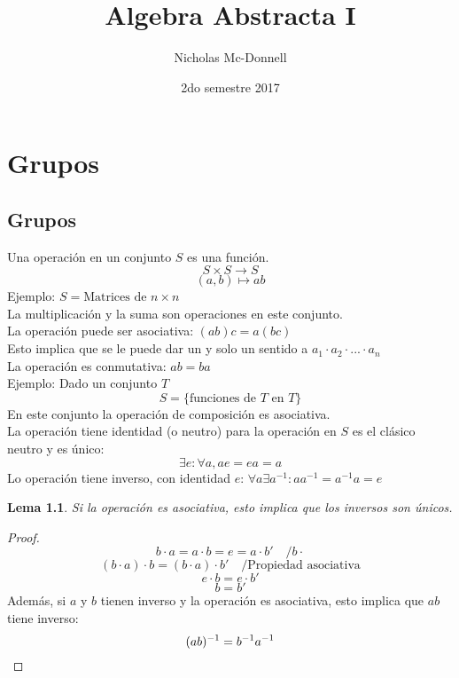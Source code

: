 \documentclass[11pt]{book}
\title{Algebra Abstracta I}
\author{Nicholas Mc-Donnell}
\date{2do semestre 2017}
\newtheorem{lem}[thm]{Lema}
\theoremstyle{definition}
\begin{document}
\maketitle

\newpage
\tableofcontents

\newpage
{}
\chapter{Grupos}
\section{Grupos}
Una operación en un conjunto $S$ es una función.\\
\[
S\times S\rightarrow S
\]
\[
(a,b)\mapsto ab
\]
Ejemplo: $S= \textrm{Matrices de } n\times n$\\
La multiplicación y la suma son operaciones en este conjunto.\\
La operación puede ser asociativa: $(ab)c=a(bc)$\\
Esto implica que se le puede dar un y solo un sentido a $a_1\cdot a_2\cdot...\cdot a_n$\\
La operación es conmutativa: $ab=ba$\\
Ejemplo: Dado un conjunto $T$
\[S=\{ \textrm{funciones de } T\textrm{ en } T\}\]
En este conjunto la operación de composición es asociativa.\\
La operación tiene identidad (o neutro) para la operación en $S$ es el clásico neutro y es único:
\[
\exists e: \forall a, ae=ea=a
\]
Lo operación tiene inverso, con identidad $e$: $\forall a \exists a^{-1}: aa^{-1}=a^{-1}a=e$\\
\begin{lem}
Si la operación es asociativa, esto implica que los inversos son únicos.\\
\end{lem}
\begin{proof}

\[
b\cdot a =a\cdot b=e=a\cdot b'\quad / b\cdot
\]
\[
(b\cdot a)\cdot b=(b\cdot a)\cdot b' \quad /\textrm{Propiedad asociativa}
\]
\[
e\cdot b= e\cdot b'
\]
\[
b=b'
\]
Además, si $a$ y $b$ tienen inverso y la operación es asociativa, esto implica que $ab$ tiene inverso:
\[
(ab)^{-1}=b^{-1}a^{-1} \qedhere
\]
\end{proof}
\end{document}
